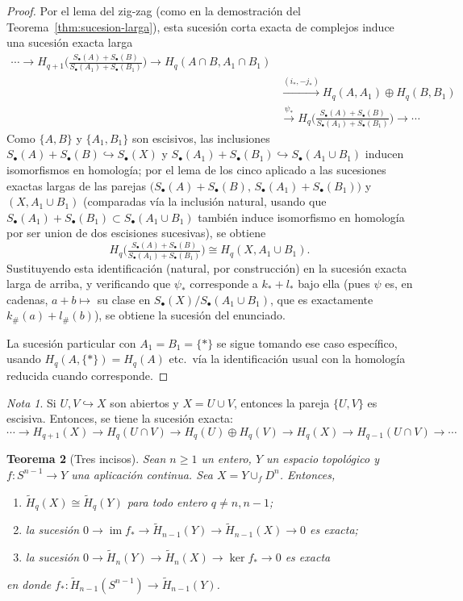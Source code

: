 \documentclass[11pt,a4paper]{article}
\theoremstyle{plain}
\newtheorem{theorem}{Teorema}[section]
\theoremstyle{definition}
\theoremstyle{remark}
\newtheorem{note}[theorem]{Nota}
\DeclareMathOperator{\im}{im}
\begin{document}
\begin{proof}
Por el lema del zig-zag (como en la demostración del
Teorema~\ref{thm:sucesion-larga}), esta sucesión corta exacta de
complejos induce una sucesión exacta larga
\[
\begin{aligned}
\cdots\to H_{q+1}\Big(\tfrac{S_\bullet(A)+S_\bullet(B)}{S_\bullet(A_1)+S_\bullet(B_1)}\Big)\to H_q(A\cap B,A_1\cap B_1)&\\
&\xrightarrow{(i_*,-j_*)}H_q(A,A_1)\oplus H_q(B,B_1)\\
&\xrightarrow{\psi_*}H_q\Big(\tfrac{S_\bullet(A)+S_\bullet(B)}{S_\bullet(A_1)+S_\bullet(B_1)}\Big)\to\cdots
\end{aligned}
\]
Como $\{A,B\}$ y $\{A_1,B_1\}$ son escisivos, las inclusiones
$S_\bullet(A)+S_\bullet(B)\hookrightarrow S_\bullet(X)$ y
$S_\bullet(A_1)+S_\bullet(B_1)\hookrightarrow S_\bullet(A_1\cup B_1)$
inducen isomorfismos en homología; por el lema de los cinco aplicado a las
sucesiones exactas largas de las parejas
$\big(S_\bullet(A)+S_\bullet(B),\,S_\bullet(A_1)+S_\bullet(B_1)\big)$ y
$(X,A_1\cup B_1)$ (comparadas vía la inclusión natural, usando que
$S_\bullet(A_1)+S_\bullet(B_1)\subset S_\bullet(A_1\cup B_1)$ también
induce isomorfismo en homología por ser union de dos escisiones
sucesivas), se obtiene
\[
H_q\Big(\tfrac{S_\bullet(A)+S_\bullet(B)}{S_\bullet(A_1)+S_\bullet(B_1)}\Big)\cong H_q(X,A_1\cup B_1).
\]
Sustituyendo esta identificación (natural, por construcción) en la
sucesión exacta larga de arriba, y verificando que
$\psi_*$ corresponde a $k_*+l_*$ bajo ella (pues $\psi$ es, en cadenas,
$a+b\mapsto$ su clase en $S_\bullet(X)/S_\bullet(A_1\cup B_1)$, que es
exactamente $k_\#(a)+l_\#(b)$), se obtiene la sucesión del enunciado.

La sucesión particular con $A_1=B_1=\{*\}$ se sigue tomando ese caso
específico, usando $H_q(A,\{*\})=H_q(A)$ etc.\ vía la identificación
usual con la homología reducida cuando corresponde.
\end{proof}

\begin{note}
\label{nota:mayer-vietoris-abiertos}
Si $U,V\hookrightarrow X$ son abiertos y $X=U\cup V$, entonces la pareja
$\{U,V\}$ es escisiva. Entonces, se tiene la sucesión exacta:
\[
\cdots\to H_{q+1}(X)\to H_q(U\cap V)\to H_q(U)\oplus H_q(V)\to H_q(X)\to H_{q-1}(U\cap V)\to\cdots
\]
\end{note}

\begin{theorem}[Tres incisos]
\label{thm:tres-incisos}
Sean $n\ge1$ un entero, $Y$ un espacio topológico y $f:S^{n-1}\to Y$ una
aplicación continua. Sea $X=Y\cup_fD^n$. Entonces,
\begin{enumerate}[label=\arabic*.]
\item $\tilde H_q(X)\cong\tilde H_q(Y)$ para todo entero $q\ne n,n-1$;
\item la sucesión $0\to\im f_*\to\tilde H_{n-1}(Y)\to\tilde H_{n-1}(X)\to0$
es exacta;
\item la sucesión $0\to\tilde H_n(Y)\to\tilde H_n(X)\to\ker f_*\to0$ es
exacta
\end{enumerate}
en donde $f_*:\tilde H_{n-1}(S^{n-1})\to\tilde H_{n-1}(Y)$.
\end{theorem}
\end{document}
